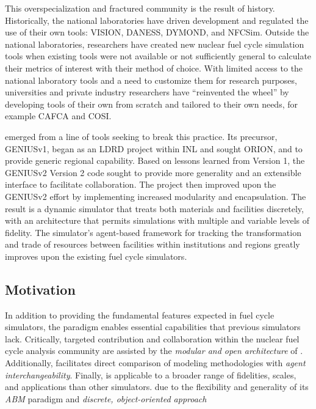 This overspecialization and fractured community is the result of history. 
Historically, the national laboratories have driven development and regulated 
the use of their own tools: \gls{VISION}\cite{jacobson_verifiable_2010}, 
\gls{DANESS}\cite{van_den_durpel_daness_2009}, 
\gls{DYMOND}\cite{yacout_modeling_2005}, and 
\gls{NFCSim}\cite{schneider_nfcsim:_2005}.  Outside the national laboratories, 
researchers have created new nuclear fuel cycle simulation tools when existing 
tools were not available or not sufficiently general to calculate their metrics 
of interest with their method of choice.  With limited access to the national 
laboratory tools and a need to customize them for research purposes, 
universities and private industry researchers have ``reinvented the wheel'' by 
developing tools of their own from scratch and tailored to their own needs, for 
example \gls{CAFCA}\cite{guerin_impact_2009} and 
\gls{COSI}\cite{boucher_cosi_2005,boucher_cosi:_2006,meyer_new_2009,coquelet-pascal_comparison_2011}. 

\Cyclus emerged from a line of tools seeking to break this practice.  
Its precursor,
\gls{GENIUSv1}\cite{dunzik-gougar_global_2007,jain_transitioning_2006}, began
as an \gls{LDRD} project within \gls{INL} and sought 
\gls{ORION}\cite{}, and 
to provide generic regional capability.  Based on lessons learned from 
Version 1, the 
\acrshort{GENIUSv2} Version 2\cite{oliver_studying_2009,huff_geniusv2_2009} code sought to 
provide more generality and an extensible interface to facilitate 
collaboration.  The \Cyclus project then improved upon the \acrshort{GENIUSv2} 
effort by implementing increased modularity and encapsulation.  The result is  
a dynamic simulator that treats both materials and facilities discretely, with 
an architecture that permits simulations with multiple and variable levels of 
fidelity. The simulator's agent-based framework for tracking the 
transformation and trade of resources between facilities within institutions 
and regions greatly improves upon the existing fuel cycle simulators.

\subsection{Motivation}

In addition to providing the fundamental features expected in fuel cycle 
simulators, the \Cyclus paradigm enables essential capabilities that previous 
simulators lack. Critically, targeted contribution and collaboration within the nuclear fuel cycle analysis 
community are assisted by the \emph{modular and open architecture} of \Cyclus.
Additionally, \Cyclus facilitates direct comparison of modeling methodologies with 
\emph{agent interchangeability}.
Finally, \Cyclus is applicable to a broader range of 
fidelities, scales, and applications than other simulators. 
due to the flexibility and generality 
of its \emph{\gls{ABM}} paradigm and \emph{discrete, object-oriented approach} 

